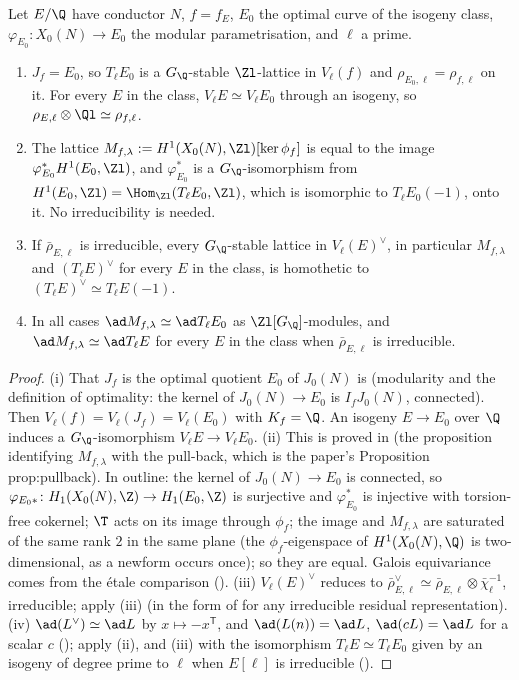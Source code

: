 \begin{theorem}\label{thm:modgalrep:comparison-E}
Let $E/\Q$ have conductor $N$, $f=f_E$, $E_0$ the optimal curve of the isogeny class, $\varphi_{E_0}\colon X_0(N)\to E_0$ the modular parametrisation, and
$\ell$ a prime.
\begin{enumerate}[label=(\roman*)]
\item $J_f=E_0$, so $T_\ell E_0$ is a $G_\Q$-stable $\Zl$-lattice in $V_\ell(f)$ and $\rho_{E_0,\ell}=\rho_{f,\ell}$ on it. For every $E$ in the class, $V_\ell E\simeq V_\ell E_0$ through
an isogeny, so $\rho_{E,\ell}\otimes\Ql\simeq\rho_{f,\ell}$.
\item The lattice $M_{f,\lambda}:=H^1(X_0(N),\Zl)[\ker\phi_f]$ is equal to the image $\varphi_{E_0}^*H^1(E_0,\Zl)$, and $\varphi_{E_0}^*$ is a $G_\Q$-isomorphism from
$H^1(E_0,\Zl)=\Hom_{\Zl}(T_\ell E_0,\Zl)$, which is isomorphic to $T_\ell E_0(-1)$, onto it. No irreducibility is needed.
\item If $\bar\rho_{E,\ell}$ is irreducible, every $G_\Q$-stable lattice in $V_\ell(E)^\vee$, in particular $M_{f,\lambda}$ and $(T_\ell E)^\vee$ for every $E$ in the class,
is homothetic to $(T_\ell E)^\vee\simeq T_\ell E(-1)$.
\item In all cases $\ad M_{f,\lambda}\simeq\ad T_\ell E_0$ as $\Zl[G_\Q]$-modules, and $\ad M_{f,\lambda}\simeq\ad T_\ell E$ for every $E$ in the class when $\bar\rho_{E,\ell}$ is
irreducible.
\end{enumerate}
\end{theorem}

\begin{proof}
(i) That $J_f$ is the optimal quotient $E_0$ of $J_0(N)$ is  (modularity and the definition of optimality: the kernel of
$J_0(N)\to E_0$ is $I_fJ_0(N)$, connected). Then $V_\ell(f)=V_\ell(J_f)=V_\ell(E_0)$ with $K_f=\Q$. An isogeny $E\to E_0$ over $\Q$ induces a $G_\Q$-isomorphism $V_\ell E\to V_\ell E_0$.
(ii) This is proved in  (the proposition identifying $M_{f,\lambda}$ with the pull-back, which is the paper's Proposition prop:pullback).
In outline: the kernel of $J_0(N)\to E_0$ is connected, so $\varphi_{E_0*}\colon H_1(X_0(N),\Z)\to H_1(E_0,\Z)$ is surjective and $\varphi_{E_0}^*$ is injective with
torsion-free cokernel; $\T$ acts on its image through $\phi_f$; the image and $M_{f,\lambda}$ are saturated of the same rank $2$ in the same plane (the
$\phi_f$-eigenspace of $H^1(X_0(N),\Q)$ is two-dimensional, as a newform occurs once); so they are equal. Galois equivariance comes from the
\'etale comparison (). (iii) $V_\ell(E)^\vee$ reduces to $\bar\rho_{E,\ell}^\vee\simeq\bar\rho_{E,\ell}\otimes\bar\chi_\ell^{-1}$, irreducible; apply
(iii) (in the form of  for any irreducible residual representation). (iv) $\ad(L^\vee)\simeq\ad L$ by
$x\mapsto-x^{\mathsf T}$, and $\ad(L(n))=\ad L$, $\ad(cL)=\ad L$ for a scalar $c$ (); apply (ii), and (iii) with the isomorphism
$T_\ell E\simeq T_\ell E_0$ given by an isogeny of degree prime to $\ell$ when $E[\ell]$ is irreducible ().
\end{proof}

